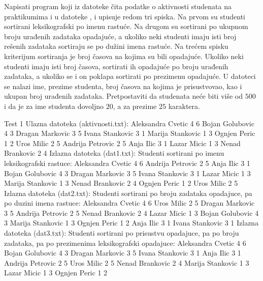 \begin{Answer}[ref=512]
\end{Answer}
\begin{Exercise}[label=513]
   Napisati program koji iz datoteke  čita
   podatke o aktivnosti studenata na praktikumima i u datoteke
   ,  i  upisuje redom
   tri spiska. Na prvom su studenti sortirani leksikografski po imenu
   rastuće. Na drugom su sortirani po ukupnom broju urađenih zadataka
   opadajuće, a ukoliko neki studenti imaju isti broj rešenih zadataka
   sortiraju se po dužini imena rastuće. Na trećem spisku kriterijum
   sortiranja je broj časova na kojima su bili opadajuće. Ukoliko neki
   studenti imaju isti broj časova, sortirati ih opadajuće po broju
   urađenih zadataka, a ukoliko se i on poklapa sortirati po prezimenu
   opadajuće. U datoteci se nalazi ime, prezime studenta, broj časova
   na kojima je prisustvovao, kao i ukupan broj urađenih
   zadataka. Pretpostaviti da studenata neće biti više od $500$ i da
   je za ime studenta dovoljno $20$, a za prezime $25$ karaktera.
  
\begin{maxitest}
\begin{test}{Test 1}
Ulazna datoteka (aktivnosti.txt):
  Aleksandra Cvetic 4 6
  Bojan Golubovic 4 3
  Dragan Markovic 3 5
  Ivana Stankovic 3 1
  Marija Stankovic 1 3
  Ognjen Peric 1 2
  Uros Milic 2 5
  Andrija Petrovic 2 5
  Anja Ilic 3 1
  Lazar Micic 1 3
  Nenad Brankovic 2 4
Izlazna datoteka (dat1.txt):
  Studenti sortirani po imenu leksikografski rastuce:
  Aleksandra Cvetic  4  6
  Andrija Petrovic  2  5
  Anja Ilic  3  1
  Bojan Golubovic  4  3
  Dragan Markovic  3  5
  Ivana Stankovic  3  1
  Lazar Micic  1  3
  Marija Stankovic  1  3
  Nenad Brankovic  2  4
  Ognjen Peric  1  2
  Uros Milic  2  5
Izlazna datoteka (dat2.txt):
  Studenti sortirani po broju zadataka opadajuce,
  pa po duzini imena rastuce:
  Aleksandra Cvetic  4  6
  Uros Milic  2  5
  Dragan Markovic  3  5
  Andrija Petrovic  2  5
  Nenad Brankovic  2  4
  Lazar Micic  1  3
  Bojan Golubovic  4  3
  Marija Stankovic  1  3
  Ognjen Peric  1  2
  Anja Ilic  3  1
  Ivana Stankovic  3  1
Izlazna datoteka (dat3.txt):
  Studenti sortirani po prisustvu opadajuce,
  pa po broju zadataka,
  pa po prezimenima leksikografski opadajuce:
  Aleksandra Cvetic  4  6
  Bojan Golubovic  4  3
  Dragan Markovic  3  5
  Ivana Stankovic  3  1
  Anja Ilic  3  1
  Andrija Petrovic  2  5
  Uros Milic  2  5
  Nenad Brankovic  2  4
  Marija Stankovic  1  3
  Lazar Micic  1  3
  Ognjen Peric  1  2
\end{test}
\end{maxitest}
  
\end{Exercise}

